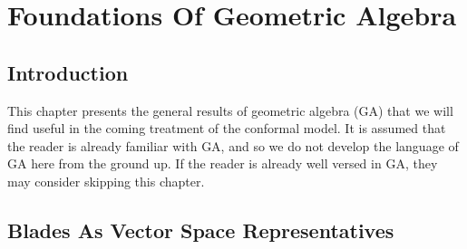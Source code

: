 
\chapter{Foundations Of Geometric Algebra}

\section{Introduction}

This chapter presents the general results of
geometric algebra (GA) that we will find useful in the
coming treatment of the conformal model.  It is assumed
that the reader is already familiar with GA, and so
we do not develop the language of GA here from the
ground up.  If the reader is already well versed in GA,
they may consider skipping this chapter.

\section{Blades As Vector Space Representatives}

